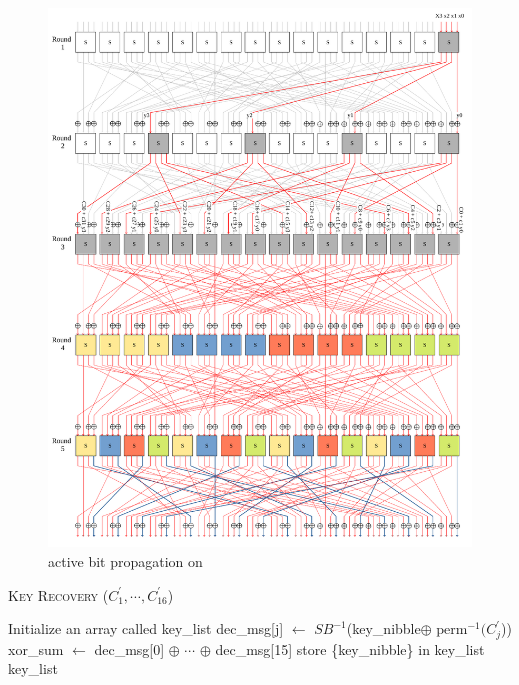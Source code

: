 \begin{figure}[!h]
	\centering
	\includegraphics[width=\linewidth]{fig/gift_cipher_active_bit_propagation.pdf}
	\caption{active bit propagation on \gift}
	\label{fig:gift_active_bit_propagation}
\end{figure}





\begin{algorithm*}[htbp]
	\caption{\textsc{Key Recovery} ($C^\prime_1, \cdots, C^\prime_{16}$)}
	\label{alg:key_recovery_1_round_gift}
	\begin{algorithmic}[1]	
		\State Initialize an array called key\_list	
			
				\State dec\_msg[j] $\gets$ $SB^{-1}$(key\_nibble$\oplus$ $\text{perm}^{-1}(C^\prime_j$))
				\EndFor
			xor\_sum $\gets$ dec\_msg[0] $\oplus$ $\cdots$ $\oplus$ dec\_msg[15]
				
			\State store \{key\_nibble\} in key\_list
			\EndIf
		\EndFor
		\Return key\_list			
	\end{algorithmic}
\end{algorithm*}






